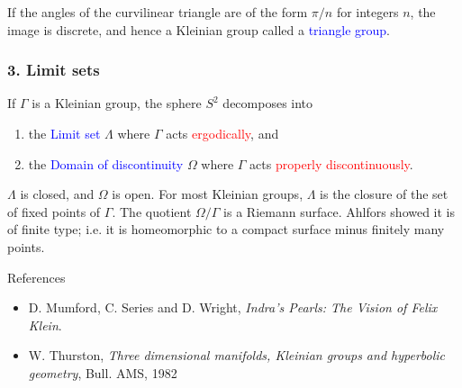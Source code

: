 \documentclass{beamer}
\begin{document}
\frame
{
If the angles of the curvilinear triangle are of the form $\pi/n$ for integers $n$, 
the image is discrete, and hence a Kleinian group
called a \textcolor{blue}{triangle group}.
}
\frame
{
\frametitle{3. Limit sets}
If $\Gamma$ is a Kleinian group, the sphere $S^2$ decomposes into 
\begin{enumerate}
\item{the \textcolor{blue}{Limit set} 
$\Lambda$ where $\Gamma$ acts \textcolor{red}{ergodically}, and}
\item{the \textcolor{blue}{Domain of discontinuity}
$\Omega$ where $\Gamma$ acts \textcolor{red}{properly discontinuously}.}
\end{enumerate}
$\Lambda$ is closed, and $\Omega$ is open. For most Kleinian groups, $\Lambda$ is the closure
of the set of fixed points of $\Gamma$.
\vskip 10pt
The quotient $\Omega/\Gamma$ is a Riemann surface. Ahlfors showed it is of
\textcolor{dgreen}{finite type}; i.e.\/ it is homeomorphic to a compact surface
minus finitely many points.
}
\frame
{
\begin{block}{References}
\begin{itemize}
\item{D. Mumford, C. Series and D. Wright, {\em Indra's Pearls: The Vision of Felix Klein}.}
\item{W. Thurston, {\em Three dimensional manifolds, Kleinian groups and hyperbolic geometry},
Bull. AMS, 1982}
\end{itemize}
\end{block}
}
\end{document}

